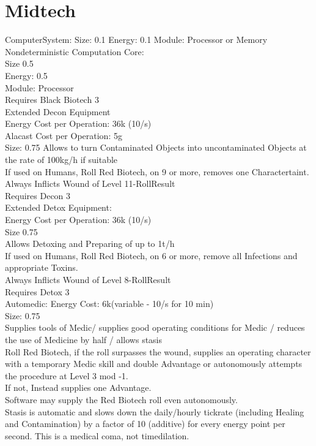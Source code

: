 \section{Midtech}\label{sec:midtech}
ComputerSystem:
Size: 0.1
Energy: 0.1
Module: Processor or Memory\\
\newline
Nondeterministic Computation Core:\\
Size 0.5\\
Energy: 0.5\\
Module: Processor\\
Requires Black Biotech 3\\
\newline
Extended Decon Equipment\\
Energy Cost per Operation: 36k (10/s)\\
Alacast Cost per Operation: 5g\\
Size: 0.75
Allows to turn Contaminated Objects into uncontaminated Objects at the rate of 100kg/h if suitable\\
If used on Humans, Roll Red Biotech, on 9 or more, removes one Charactertaint.\\
Always Inflicts Wound of Level 11-RollResult\\
Requires Decon 3\\
\newline
Extended Detox Equipment:\\
Energy Cost per Operation: 36k (10/s)\\
Size 0.75\\
Allows Detoxing and Preparing of up to 1t/h\\
If used on Humans, Roll Red Biotech, on 6 or more, remove all Infections and appropriate Toxins.\\
Always Inflicts Wound of Level 8-RollResult\\
Requires Detox 3\\
\newline
Automedic:
Energy Cost: 6k(variable - 10/s for 10 min)\\
Size: 0.75\\
Supplies tools of Medic/ supplies good operating conditions for Medic / reduces the use of Medicine by half / allows stasis\\
Roll Red Biotech, if the roll surpasses the wound, supplies an operating character with a temporary Medic skill and
double Advantage or autonomously attempts the procedure at Level 3 mod -1.\\
If not, Instead supplies one Advantage.\\
Software may supply the Red Biotech roll even autonomously.\\
Stasis is automatic and slows down the daily/hourly tickrate (including Healing and Contamination) by a factor of 10
(additive) for every energy point per second.
This is a medical coma, not timedilation.
